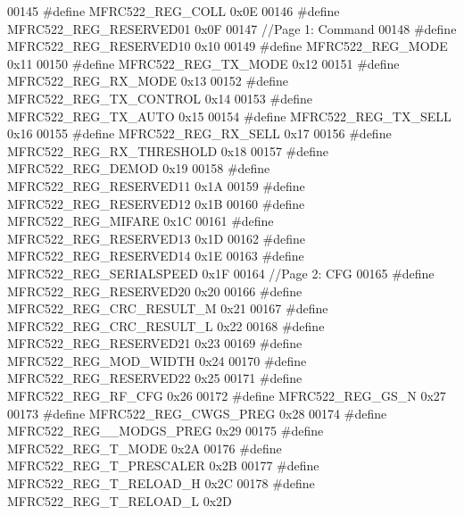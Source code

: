 \begin{DoxyCode}
00145 \textcolor{preprocessor}{#define MFRC522\_REG\_COLL                0x0E}
00146 \textcolor{preprocessor}{#define MFRC522\_REG\_RESERVED01          0x0F}
00147 \textcolor{comment}{//Page 1: Command }
00148 \textcolor{preprocessor}{#define MFRC522\_REG\_RESERVED10          0x10}
00149 \textcolor{preprocessor}{#define MFRC522\_REG\_MODE                0x11}
00150 \textcolor{preprocessor}{#define MFRC522\_REG\_TX\_MODE             0x12}
00151 \textcolor{preprocessor}{#define MFRC522\_REG\_RX\_MODE             0x13}
00152 \textcolor{preprocessor}{#define MFRC522\_REG\_TX\_CONTROL          0x14}
00153 \textcolor{preprocessor}{#define MFRC522\_REG\_TX\_AUTO             0x15}
00154 \textcolor{preprocessor}{#define MFRC522\_REG\_TX\_SELL             0x16}
00155 \textcolor{preprocessor}{#define MFRC522\_REG\_RX\_SELL             0x17}
00156 \textcolor{preprocessor}{#define MFRC522\_REG\_RX\_THRESHOLD        0x18}
00157 \textcolor{preprocessor}{#define MFRC522\_REG\_DEMOD               0x19}
00158 \textcolor{preprocessor}{#define MFRC522\_REG\_RESERVED11          0x1A}
00159 \textcolor{preprocessor}{#define MFRC522\_REG\_RESERVED12          0x1B}
00160 \textcolor{preprocessor}{#define MFRC522\_REG\_MIFARE              0x1C}
00161 \textcolor{preprocessor}{#define MFRC522\_REG\_RESERVED13          0x1D}
00162 \textcolor{preprocessor}{#define MFRC522\_REG\_RESERVED14          0x1E}
00163 \textcolor{preprocessor}{#define MFRC522\_REG\_SERIALSPEED         0x1F}
00164 \textcolor{comment}{//Page 2: CFG    }
00165 \textcolor{preprocessor}{#define MFRC522\_REG\_RESERVED20          0x20  }
00166 \textcolor{preprocessor}{#define MFRC522\_REG\_CRC\_RESULT\_M        0x21}
00167 \textcolor{preprocessor}{#define MFRC522\_REG\_CRC\_RESULT\_L        0x22}
00168 \textcolor{preprocessor}{#define MFRC522\_REG\_RESERVED21          0x23}
00169 \textcolor{preprocessor}{#define MFRC522\_REG\_MOD\_WIDTH           0x24}
00170 \textcolor{preprocessor}{#define MFRC522\_REG\_RESERVED22          0x25}
00171 \textcolor{preprocessor}{#define MFRC522\_REG\_RF\_CFG              0x26}
00172 \textcolor{preprocessor}{#define MFRC522\_REG\_GS\_N                0x27}
00173 \textcolor{preprocessor}{#define MFRC522\_REG\_CWGS\_PREG           0x28}
00174 \textcolor{preprocessor}{#define MFRC522\_REG\_\_MODGS\_PREG         0x29}
00175 \textcolor{preprocessor}{#define MFRC522\_REG\_T\_MODE              0x2A}
00176 \textcolor{preprocessor}{#define MFRC522\_REG\_T\_PRESCALER         0x2B}
00177 \textcolor{preprocessor}{#define MFRC522\_REG\_T\_RELOAD\_H          0x2C}
00178 \textcolor{preprocessor}{#define MFRC522\_REG\_T\_RELOAD\_L          0x2D}

\end{DoxyCode}
